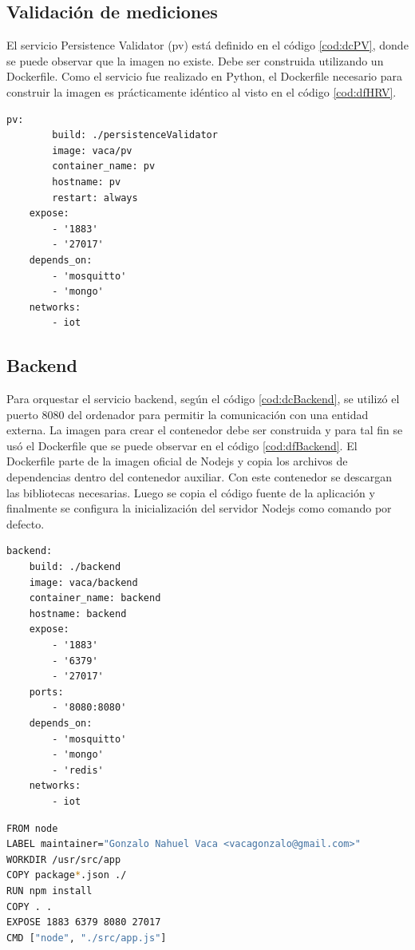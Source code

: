 \newpage

\subsection{Validación de mediciones}

El servicio Persistence Validator (pv) está definido en el código \ref{cod:dcPV}, donde se puede observar que la imagen no existe.
Debe ser construida utilizando un Dockerfile.
Como el servicio fue realizado en Python, el Dockerfile necesario para construir la imagen es prácticamente idéntico al visto en el código \ref{cod:dfHRV}.


\begin{lstlisting}[label=cod:dcPV,caption=Orquestación del servicio pv.]
	pv:
		build: ./persistenceValidator
		image: vaca/pv
		container_name: pv
		hostname: pv
		restart: always
	expose: 
		- '1883'
		- '27017'
	depends_on: 
		- 'mosquitto'
		- 'mongo'
	networks: 
		- iot
\end{lstlisting}

\subsection{Backend}

Para orquestar el servicio backend, según el código \ref{cod:dcBackend}, se utilizó el puerto 8080 del ordenador para permitir la comunicación con una entidad externa.
La imagen para crear el contenedor debe ser construida y para tal fin se usó el Dockerfile que se puede observar en el código \ref{cod:dfBackend}.
El Dockerfile parte de la imagen oficial de Nodejs y copia los archivos de dependencias dentro del contenedor auxiliar.
Con este contenedor se descargan las bibliotecas necesarias.
Luego se copia el código fuente de la aplicación y finalmente se configura la inicialización del servidor Nodejs como comando por defecto.

\begin{lstlisting}[label=cod:dcBackend,caption=Orquestación del servicio Backend.]
backend:
	build: ./backend
	image: vaca/backend
	container_name: backend
	hostname: backend
	expose: 
		- '1883'
		- '6379'
		- '27017'
	ports: 
		- '8080:8080'
	depends_on:
		- 'mosquitto' 
		- 'mongo'
		- 'redis'
	networks: 
		- iot
\end{lstlisting}

\newpage

\begin{lstlisting}[language=bash,label=cod:dfBackend,caption=Dockerfile del servicio Backend.]
FROM node
LABEL maintainer="Gonzalo Nahuel Vaca <vacagonzalo@gmail.com>"
WORKDIR /usr/src/app
COPY package*.json ./
RUN npm install
COPY . .
EXPOSE 1883 6379 8080 27017
CMD ["node", "./src/app.js"]
\end{lstlisting}

